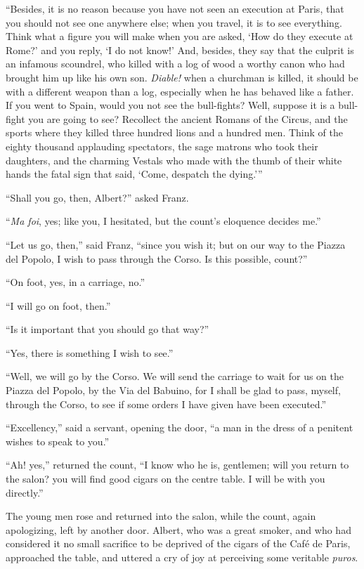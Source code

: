 “Besides, it is no reason because you have not seen an execution at
Paris, that you should not see one anywhere else; when you travel, it
is to see everything. Think what a figure you will make when you are
asked, ‘How do they execute at Rome?’ and you reply, ‘I do not know!’
And, besides, they say that the culprit is an infamous scoundrel, who
killed with a log of wood a worthy canon who had brought him up like
his own son. \textit{Diable!} when a churchman is killed, it should be with a
different weapon than a log, especially when he has behaved like a
father. If you went to Spain, would you not see the bull-fights? Well,
suppose it is a bull-fight you are going to see? Recollect the ancient
Romans of the Circus, and the sports where they killed three hundred
lions and a hundred men. Think of the eighty thousand applauding
spectators, the sage matrons who took their daughters, and the charming
Vestals who made with the thumb of their white hands the fatal sign
that said, ‘Come, despatch the dying.’”

“Shall you go, then, Albert?” asked Franz.

“\textit{Ma foi}, yes; like you, I hesitated, but the count’s eloquence
decides me.”

“Let us go, then,” said Franz, “since you wish it; but on our way to
the Piazza del Popolo, I wish to pass through the Corso. Is this
possible, count?”

“On foot, yes, in a carriage, no.”

“I will go on foot, then.”

“Is it important that you should go that way?”

“Yes, there is something I wish to see.”

“Well, we will go by the Corso. We will send the carriage to wait for
us on the Piazza del Popolo, by the Via del Babuino, for I shall be
glad to pass, myself, through the Corso, to see if some orders I have
given have been executed.”

“Excellency,” said a servant, opening the door, “a man in the dress of
a penitent wishes to speak to you.”

“Ah! yes,” returned the count, “I know who he is, gentlemen; will you
return to the salon? you will find good cigars on the centre table. I
will be with you directly.”

The young men rose and returned into the salon, while the count, again
apologizing, left by another door. Albert, who was a great smoker, and
who had considered it no small sacrifice to be deprived of the cigars
of the Café de Paris, approached the table, and uttered a cry of joy at
perceiving some veritable \textit{puros}.

